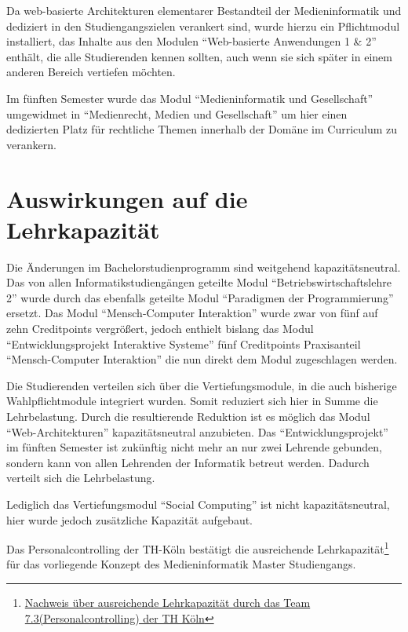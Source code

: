 Da web-basierte Architekturen elementarer Bestandteil der
Medieninformatik und dediziert in den Studiengangszielen verankert sind,
wurde hierzu ein Pflichtmodul installiert, das Inhalte aus den Modulen
``Web-basierte Anwendungen 1 \& 2'' enthält, die alle Studierenden
kennen sollten, auch wenn sie sich später in einem anderen Bereich
vertiefen möchten.

Im fünften Semester wurde das Modul ``Medieninformatik und
Gesellschaft'' umgewidmet in ``Medienrecht, Medien und Gesellschaft'' um
hier einen dedizierten Platz für rechtliche Themen innerhalb der Domäne
im Curriculum zu verankern.

\section{Auswirkungen auf die
Lehrkapazität}\label{auswirkungen-auf-die-lehrkapazituxe4t}

Die Änderungen im Bachelorstudienprogramm sind weitgehend
kapazitätsneutral. Das von allen Informatikstudiengängen geteilte Modul
``Betriebswirtschaftslehre 2'' wurde durch das ebenfalls geteilte Modul
``Paradigmen der Programmierung'' ersetzt. Das Modul ``Mensch-Computer
Interaktion'' wurde zwar von fünf auf zehn Creditpoints vergrößert,
jedoch enthielt bislang das Modul ``Entwicklungsprojekt Interaktive
Systeme'' fünf Creditpoints Praxisanteil ``Mensch-Computer Interaktion''
die nun direkt dem Modul zugeschlagen werden.

Die Studierenden verteilen sich über die Vertiefungsmodule, in die auch
bisherige Wahlpflichtmodule integriert wurden. Somit reduziert sich hier
in Summe die Lehrbelastung. Durch die resultierende Reduktion ist es
möglich das Modul ``Web-Architekturen'' kapazitätsneutral anzubieten.
Das ``Entwicklungsprojekt'' im fünften Semester ist zukünftig nicht mehr
an nur zwei Lehrende gebunden, sondern kann von allen Lehrenden der
Informatik betreut werden. Dadurch verteilt sich die Lehrbelastung.

Lediglich das Vertiefungsmodul ``Social Computing'' ist nicht
kapazitätsneutral, hier wurde jedoch zusätzliche Kapazität aufgebaut.

Das Personalcontrolling der TH-Köln bestätigt die ausreichende
Lehrkapazität\footnote{\href{https://th-koeln.github.io/mi-2017/anhaenge/th-verwaltung-kapa-nachweis.pdf}{Nachweis
  über ausreichende Lehrkapazität durch das Team
  7.3(Personalcontrolling) der TH Köln}} für das vorliegende Konzept des
Medieninformatik Master Studiengangs.

